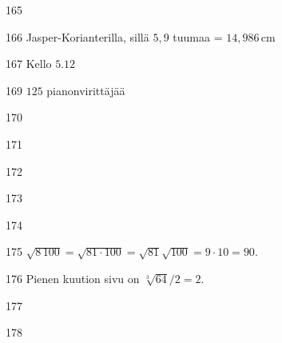 \begin{Vastaus}{165}
	
\end{Vastaus}
\begin{Vastaus}{166}
Jasper-Korianterilla, sillä $5,9$ tuumaa = $14,986$\,cm
	
\end{Vastaus}
\begin{Vastaus}{167}
Kello $5.12$
	
\end{Vastaus}
\begin{Vastaus}{169}
$125$ pianonvirittäjää
	
\end{Vastaus}
\begin{Vastaus}{170}
	
\end{Vastaus}
\begin{Vastaus}{171}
	
\end{Vastaus}
\begin{Vastaus}{172}
	
\end{Vastaus}
\begin{Vastaus}{173}
	
\end{Vastaus}
\begin{Vastaus}{174}
	
\end{Vastaus}
\begin{Vastaus}{175}
$\sqrt{8\,100}=\sqrt{81\cdot100}=\sqrt{81}\sqrt{100}=9\cdot 10=90$.
	
\end{Vastaus}
\begin{Vastaus}{176}
Pienen kuution sivu on $\sqrt[3]{64}/2=2$.
	
\end{Vastaus}
\begin{Vastaus}{177}
	
\end{Vastaus}
\begin{Vastaus}{178}
	
\end{Vastaus}
